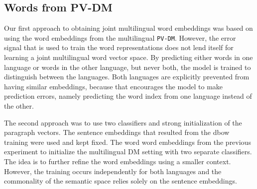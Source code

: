 
% 
% 

\subsection{Words from PV-DM}
Our first approach to obtaining joint multilingual word embeddings was based on using the word embeddings from the multilingual \texttt{PV-DM}.
However, the error signal that is used to train the word representations does not lend itself for learning a joint multilingual word vector space.
By predicting either words in one language or words in the other language, but never both, the model is trained to distinguish between the languages.
Both languages are explicitly prevented from having similar embeddings, because that encourages the model to make prediction errors, namely predicting the word index from one language instead of the other.



The second approach was to use two classifiers and strong initialization of the paragraph vectors.
The sentence embeddings that resulted from the dbow training were used and kept fixed.
The word word embeddings from the previous experiment to initialize the multilingual DM setting with two separate classifiers.
The idea is to further refine the word embeddings using a smaller context.
However, the training occurs independently for both languages and the commonality of the semantic space relies solely on the sentence embeddings.



